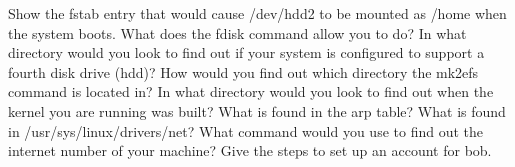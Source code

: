 Show the {\ltt{}fstab} entry that would cause
{\ltt{}/dev/hdd2} to be mounted as {\ltt{}/home} when the system boots.
\vskip 0.6in
What does the {\ltt{}fdisk} command allow you to do?
\vskip 1.2in
\vfill\eject
\ques
In what directory would you look to find out if your system is configured
to support a fourth disk drive (hdd)?
\vskip 0.5in
How would you find out which directory the {\ltt{}mk2efs} command is 
located in?
\vskip 0.5in
In what directory would you look to find out when the kernel you are
running was built?
\vskip 0.5in
\ques
What is found in the arp table?
\vskip 0.8in
What is found in {\ltt{}/usr/sys/linux/drivers/net}?
\vskip 0.8in
What command would you use to find out the internet number
of your machine?
\vskip 0.5in
\ques
Give the steps to set up an account for {\ltt{}bob}.
\vskip 2.0in
\bye
